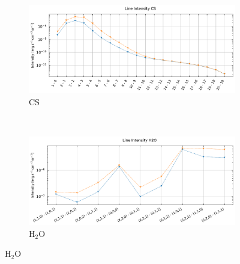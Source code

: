 \begin{appendices}
\begin{figure}[!h]
    \centering
    \begin{subfigure}[t]{0.49\textwidth} %
        \centering \includegraphics[trim = {0 0 0 1cm},clip,width=1\textwidth]{figure/Cl/gridModelEmiss/I_comp_CS.pdf}
        \caption{$\mathrm{CS}$}
    \end{subfigure}
    ~ 
   \begin{subfigure}[t]{0.49\textwidth} %
        \centering \includegraphics[trim = {0 0 0 1cm},clip,width=1\textwidth]{figure/Cl/gridModelEmiss/I_comp_H2O.pdf}
        \caption{$\mathrm{H}_2\mathrm{O}$}
    \end{subfigure}
    

\end{figure}
\end{appendices}
